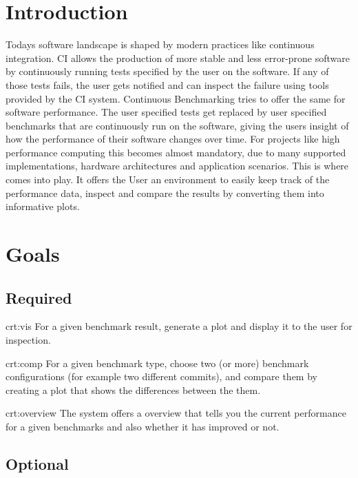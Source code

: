 \section{Introduction}

Todays software landscape is shaped by modern practices like continuous integration. CI allows the production of more stable and less error-prone software by continuously running tests specified by the user on the software. If any of those tests fails, the user gets notified and can inspect the failure using tools provided by the CI system. Continuous Benchmarking tries to offer the same for software performance. The user specified tests get replaced by user specified benchmarks that are continuously run on the software, giving the users insight of how the performance of their software changes over time. For projects like high performance computing this becomes almost mandatory, due to many supported implementations, hardware architectures and application scenarios. This is where \parkview{} comes into play. It offers the User an environment to easily keep track of the performance data, inspect and compare the results by converting them into informative plots.

\section{Goals}

\subsection{Required}

{crt:vis}
{For a given benchmark result, generate a \gls{plot} and display it to the user for inspection.}

{crt:comp}
{For a given benchmark type, choose two (or more) \glspl{benchmark configuration} (for example two different commits), and compare them by creating a plot that shows the differences between the them.}

{crt:overview}
{The system offers a overview that tells you the current performance for a given benchmarks and also whether it has improved or not.}

\subsection{Optional}

